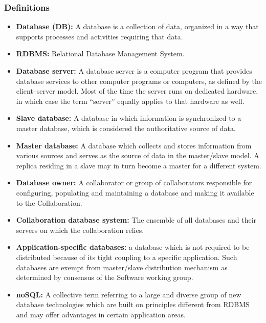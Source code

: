 \subsubsection{Definitions}
\begin{itemize}
\item \textbf{Database (DB):} A database is a collection of data, organized in a way that supports processes and activities requiring that data.
\item \textbf{RDBMS:} Relational Database Management System.
\item \textbf{Database server:} A database server is a computer program that provides database services to other computer programs or computers, as defined by the client–server model. Most of the time the server runs on dedicated hardware, in which case the term ``server'' equally applies to that hardware as well.
\item \textbf{Slave database:} A database in which information is synchronized to a master database, which is considered the authoritative source of data.
\item \textbf{Master database:} A database which collects and stores information from various sources and serves as the source of data in the master/slave model. A replica residing in a slave may in turn become a master for a different system.
\item \textbf{Database owner:} A collaborator or group of collaborators responsible for configuring, populating and maintaining a database and making it available to the Collaboration.
\item \textbf{Collaboration database system:} The ensemble of all databases and their servers on which the collaboration relies.
\item \textbf{Application-specific databases:} a database which is not required to be distributed because of its tight coupling to a specific application. Such databases are exempt from master/slave distribution mechanism as determined by consensus of the Software working group.
\item \textbf{noSQL:} A collective term referring to a large and diverse group of new database technologies which are built on principles different from RDBMS and may offer advantages in certain application areas.
\end{itemize}

